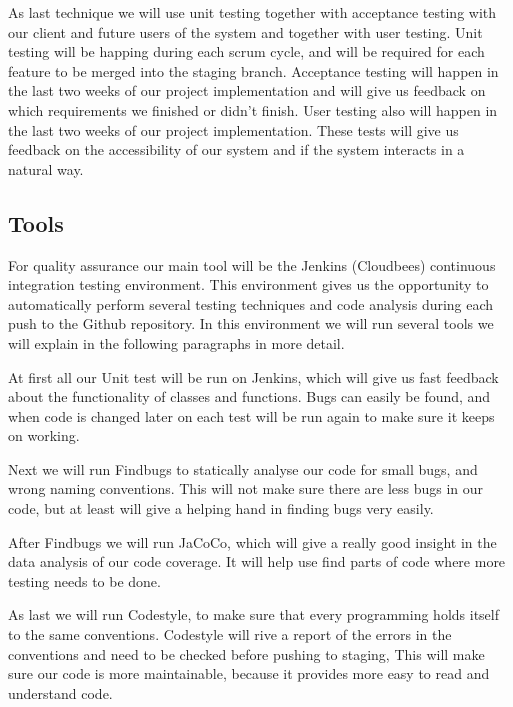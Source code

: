 \documentclass[]{article}
\begin{document}
As last technique we will use unit testing together with acceptance testing with our client and future users of the system and together with user testing.
Unit testing will be happing during each scrum cycle, and will be required for each feature to be merged into the staging branch.
Acceptance testing will happen in the last two weeks of our project implementation and will give us feedback on which requirements we finished or didn't finish.
User testing also will happen in the last two weeks of our project implementation.
These tests will give us feedback on the accessibility of our system and if the system interacts in a natural way.

\subsection{Tools}
For quality assurance our main tool will be the Jenkins (Cloudbees) continuous integration testing environment.
This environment gives us the opportunity to automatically perform several testing techniques and code analysis during each push to the Github repository.
In this environment we will run several tools we will explain in the following paragraphs in more detail.

At first all our Unit test will be run on Jenkins, which will give us fast feedback about the functionality of classes and functions.
Bugs can easily be found, and when code is changed later on each test will be run again to make sure it keeps on working.

Next we will run Findbugs to statically analyse our code for small bugs, and wrong naming conventions.
This will not make sure there are less bugs in our code, but at least will give a helping hand in finding bugs very easily.

After Findbugs we will run JaCoCo, which will give a really good insight in the data analysis of our code coverage.
It will help use find parts of code where more testing needs to be done.

As last we will run Codestyle, to make sure that every programming holds itself to the same conventions.
Codestyle will rive a report of the errors in the conventions and need to be checked before pushing to staging,
This will make sure our code is more maintainable, because it provides more easy to read and understand code.

\newpage


\end{document}
